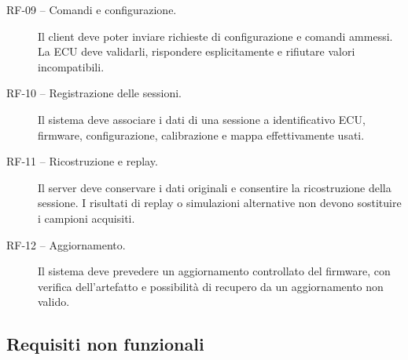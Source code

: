\documentclass{article}
\begin{document}
\begin{description}
    \item[RF-09 -- Comandi e configurazione.] Il client deve poter inviare
          richieste di configurazione e comandi ammessi. La ECU deve validarli,
          rispondere esplicitamente e rifiutare valori incompatibili.

    \item[RF-10 -- Registrazione delle sessioni.] Il sistema deve associare i
          dati di una sessione a identificativo ECU, firmware, configurazione,
          calibrazione e mappa effettivamente usati.

    \item[RF-11 -- Ricostruzione e replay.] Il server deve conservare i dati
          originali e consentire la ricostruzione della sessione. I risultati
          di replay o simulazioni alternative non devono sostituire i campioni
          acquisiti.

    \item[RF-12 -- Aggiornamento.] Il sistema deve prevedere un aggiornamento
          controllato del firmware, con verifica dell'artefatto e possibilità
          di recupero da un aggiornamento non valido.
\end{description}

\subsection{Requisiti non funzionali}
\end{document}
